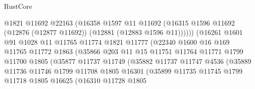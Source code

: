 \begin{lexlean}{RustCore}
\begin{coremodule}
                                @1821
                                @11692
                                @22163
                                (@16358
                                  @1597
                                  @11
                                  @11692
                                  (@16315
                                    @1596
                                    @11692
                                    (@12876 (@12877 @11692))
                                    (@12881 (@12883 @1596 @11))))))
                            (@16261
                              @1601
                              @91
                              @1028
                              @11
                              @11765
                              @11774
                              @1821
                              @11777
                              (@22340
                                @1600
                                @16
                                @169
                                @11765
                                @11772
                                @1863
                                (@35866
                                  @203
                                  @11
                                  @15
                                  @11751
                                  @11764
                                  @11771
                                  @1799
                                  @11700
                                  @1805
                                  (@35877
                                    @11737
                                    @11749
                                    (@35882
                                      @11737
                                      @11747
                                      @4536
                                      (@35889
                                        @11736
                                        @11746
                                        @1799
                                        @11708
                                        @1805
                                        @16301
                                        (@35899
                                          @11735
                                          @11745
                                          @1799
                                          @11718
                                          @1805
                                          @16625
                                          (@16310
                                            @11728
                                            @1805

\end{coremodule}
\end{lexlean}
